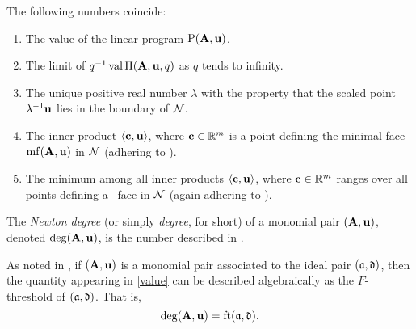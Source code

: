 \documentclass{article}
\begin{document}
\begin{proposition}
   \label{FT descriptions: P}
   The following numbers coincide\textup:
   \begin{enumerate}[$(1)$]
      \item\label{value} The value of the linear program $\mathrm{P}(\mathbf{A}, \mathbf{u})$.
      \item\label{limit} The limit of $q^{-1}\operatorname{val} \Pi(\mathbf{A},\mathbf{u},q)$ as $q$ tends to infinity.
      \item\label{lambda} The unique positive real number $\lambda$ with the property that the scaled point $\lambda^{-1}\mathbf{u}$ lies in the boundary of $\mathcal{N}$.
      \item\label{new ip} The inner product $\langle \mathbf{c}, \mathbf{u} \rangle$, where $\mathbf{c} \in \mathbb{R}^m$ is a point defining the minimal face $\operatorname{mf}(\mathbf{A}, \mathbf{u})$ in $\mathcal{N}$ \textup(adhering to \textup).
      \item\label{min} The minimum among all inner products $\langle \mathbf{c}, \mathbf{u} \rangle$, where $\mathbf{c} \in \mathbb{R}^m$ ranges over all points defining a \positive\ face in $\mathcal{N}$ \textup(again adhering to \textup).
   \end{enumerate}
\end{proposition}

\begin{definition}
\label{FT: D}
   The \emph{Newton degree} (or simply \emph{degree}, for short) of a monomial pair $(\mathbf{A}, \mathbf{u})$, denoted $\operatorname{deg}(\mathbf{A},\mathbf{u})$, is the number described in .
\end{definition}

\begin{remark}
   As noted in , if $(\mathbf{A},\mathbf{u})$ is a monomial pair associated to the ideal pair $(\mathfrak{a},\mathfrak{d})$, then the quantity appearing in \ref{value} can be described algebraically as the $F$-threshold of $(\mathfrak{a},\mathfrak{d})$.
   That is,
   \[\operatorname{deg}(\mathbf{A},\mathbf{u}) = \operatorname{ft}(\mathfrak{a}, \mathfrak{d}).\]
\end{remark}
\end{document}
